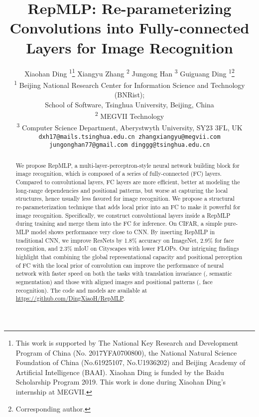 \documentclass[10pt,twocolumn,letterpaper]{article}
\begin{document}
\title{RepMLP: Re-parameterizing Convolutions into Fully-connected Layers for Image Recognition}

\author{Xiaohan Ding \textsuperscript{1}\thanks{This work is supported by The National Key Research and Development Program of China (No. 2017YFA0700800), the National Natural Science Foundation of China (No.61925107, No.U1936202) and Beijing Academy of Artificial Intelligence (BAAI). Xiaohan Ding is funded by the Baidu Scholarship Program 2019. This work is done during Xiaohan Ding's internship at MEGVII.} \quad Xiangyu Zhang \textsuperscript{2} \quad Jungong Han \textsuperscript{3} \quad Guiguang Ding \textsuperscript{1}\thanks{Corresponding author.} \\
	\textsuperscript{1} Beijing National Research Center for Information Science and Technology (BNRist); \\School of Software, Tsinghua University, Beijing, China \\
	\textsuperscript{2} MEGVII Technology \\
	\textsuperscript{3} Computer Science Department, Aberystwyth University, SY23 3FL, UK \\
	\tt\small dxh17@mails.tsinghua.edu.cn \quad zhangxiangyu@megvii.com\\
	\tt\small jungonghan77@gmail.com \quad dinggg@tsinghua.edu.cn\\
}

\maketitle
\ificcvfinal\thispagestyle{empty}\fi

\begin{abstract} 
	We propose RepMLP, a multi-layer-perceptron-style neural network building block for image recognition, which is composed of a series of fully-connected (FC) layers. Compared to convolutional layers, FC layers are more efficient, better at modeling the long-range dependencies and positional patterns, but worse at capturing the local structures, hence usually less favored for image recognition. We propose a structural re-parameterization technique that adds local prior into an FC to make it powerful for image recognition. Specifically, we construct convolutional layers inside a RepMLP during training and merge them into the FC for inference. On CIFAR, a simple pure-MLP model shows performance very close to CNN. By inserting RepMLP in traditional CNN, we improve ResNets by 1.8\% accuracy on ImageNet, 2.9\% for face recognition, and 2.3\% mIoU on Cityscapes with lower FLOPs. Our intriguing findings highlight that combining the global representational capacity and positional perception of FC with the local prior of convolution can improve the performance of neural network with faster speed on both the tasks with translation invariance (\eg, semantic segmentation) and those with aligned images and positional patterns (\eg, face recognition). The code and models are available at \url{https://github.com/DingXiaoH/RepMLP}.
\end{abstract}
\end{document}
